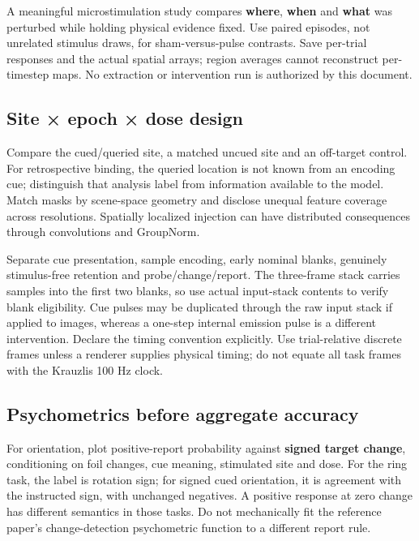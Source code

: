 \documentclass[
  10pt,
]{article}
\begin{document}
A meaningful microstimulation study compares \textbf{where},
\textbf{when} and \textbf{what} was perturbed while holding physical
evidence fixed. Use paired episodes, not unrelated stimulus draws, for
sham-versus-pulse contrasts. Save per-trial responses and the actual
spatial arrays; region averages cannot reconstruct per-timestep maps. No
extraction or intervention run is authorized by this document.

\subsection{Site × epoch × dose design}\label{site-epoch-dose-design}

Compare the cued/queried site, a matched uncued site and an off-target
control. For retrospective binding, the queried location is not known
from an encoding cue; distinguish that analysis label from information
available to the model. Match masks by scene-space geometry and disclose
unequal feature coverage across resolutions. Spatially localized
injection can have distributed consequences through convolutions and
GroupNorm.

Separate cue presentation, sample encoding, early nominal blanks,
genuinely stimulus-free retention and probe/change/report. The
three-frame stack carries samples into the first two blanks, so use
actual input-stack contents to verify blank eligibility. Cue pulses may
be duplicated through the raw input stack if applied to images, whereas
a one-step internal emission pulse is a different intervention. Declare
the timing convention explicitly. Use trial-relative discrete frames
unless a renderer supplies physical timing; do not equate all task
frames with the Krauzlis 100 Hz clock.

\subsection{Psychometrics before aggregate
accuracy}\label{psychometrics-before-aggregate-accuracy}

For orientation, plot positive-report probability against \textbf{signed
target change}, conditioning on foil changes, cue meaning, stimulated
site and dose. For the ring task, the label is rotation sign; for signed
cued orientation, it is agreement with the instructed sign, with
unchanged negatives. A positive response at zero change has different
semantics in those tasks. Do not mechanically fit the reference paper's
change-detection psychometric function to a different report rule.
\end{document}
